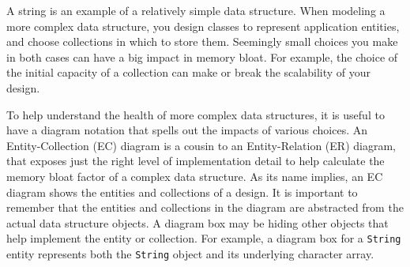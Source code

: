 \documentclass{book}
\theoremstyle{definition}
\begin{document}
A string is an example of a relatively simple data structure.  When
modeling a more complex data structure, you design classes to
represent application entities, and choose collections in which to
store them. Seemingly small choices you make in both cases can have a
big impact in memory bloat. For example, the choice of the initial
capacity of a collection can make or break the scalability of your
design. 

To help understand the health of more complex data structures, it is
useful to have a diagram notation that spells out the impacts of various choices.  An Entity-Collection (EC) diagram is a cousin to an Entity-Relation (ER) diagram, that exposes just the right level of implementation detail to help calculate the memory bloat
factor of a complex data structure. As its name implies, an EC diagram shows the entities and collections of a design. It is important to remember that the entities and collections in the diagram are abstracted from the actual data structure objects. A diagram box may be hiding other objects that help implement the entity or collection. For example, a diagram box for a \texttt{String} entity represents both the \texttt{String} object and its underlying character
array. 
\end{document}
